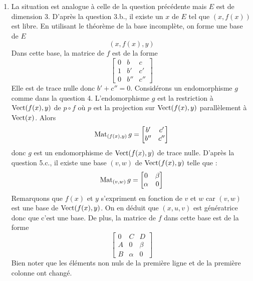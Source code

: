\begin{enumerate}
\begin{enumerate}
\item La situation est analogue à celle de la question précédente mais $E$ est de dimension $3$. D'après la question 3.b., il existe un $x$ de $E$ tel que $(x,f(x))$ est libre. En utilisant le théorème de la base incomplète, on forme une base de $E$
\begin{displaymath}
 (x,f(x),y)
\end{displaymath}
Dans cette base, la matrice de $f$ est de la forme
\begin{displaymath}
 \begin{bmatrix}
  0 & b & c \\
 1 & b' & c' \\
 0 & b'' & c''
 \end{bmatrix}
\end{displaymath}
Elle est de trace nulle donc $b'+c''=0$.\newline
Considérons un endomorphisme $g$ comme dans la question 4. L'endomorphisme $g$ est la restriction à $\operatorname{Vect}(f(x),y)$ de $p\circ f$ où $p$ est la projection sur $\operatorname{Vect}(f(x),y)$ parallèlement à $\operatorname{Vect}(x)$. Alors
\begin{displaymath}
 \operatorname{Mat}_{(f(x),y)}g = 
\begin{bmatrix}
 b' & c' \\
 b'' & c''
\end{bmatrix}
\end{displaymath}
donc $g$ est un endomorphisme de $\operatorname{Vect}(f(x),y)$ de trace nulle. D'après la question 5.c., il existe une base $(v,w)$ de $\operatorname{Vect}(f(x),y)$ telle que :
\begin{displaymath}
 \operatorname{Mat}_{(v,w)}g = 
\begin{bmatrix}
 0 & \beta \\
 \alpha & 0
\end{bmatrix}
\end{displaymath}
Remarquons que $f(x)$ et $y$ s'expriment en fonction de $v$ et $w$ car $(v,w)$ est une base de $\operatorname{Vect}(f(x),y)$. On en déduit que $(x,u,v)$ est génératrice donc que c'est une base. De plus, la matrice de $f$ dans cette base est de la forme
\begin{displaymath}
 \begin{bmatrix}
  0 & C & D \\
 A & 0 & \beta \\
 B & \alpha & 0
 \end{bmatrix}
\end{displaymath}
Bien noter que les éléments non nuls de la première ligne et de la première colonne ont changé.
\end{enumerate}
\end{enumerate}
